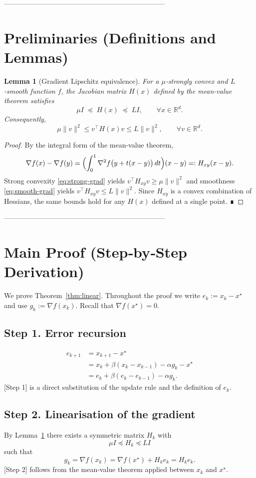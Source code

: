 \documentclass[11pt]{article}
\newtheorem{lemma}{Lemma}
\newcommand{\grad}{\nabla}
\newcommand{\R}{\mathbb{R}}
\begin{document}
---------------------------------------------------------------------

\newpage
\section*{Preliminaries (Definitions and Lemmas)}
\begin{lemma}[Gradient Lipschitz equivalence]\label{lem:grad-bounds}
For a $\mu$‑strongly convex and $L$‑smooth function $f$, the Jacobian matrix $H(x)$ defined by the mean‑value theorem satisfies
\[
\mu I \;\preceq\; H(x) \;\preceq\; L I ,\qquad\forall x\in\R^d .
\]
Consequently,
\[
\mu\|v\|^2 \le v^\top H(x) v \le L\|v\|^2 ,\qquad\forall v\in\R^d .
\]
\end{lemma}
\begin{proof}
By the integral form of the mean‑value theorem,
\[
\grad f(x)-\grad f(y)=\Bigl(\int_{0}^{1} \nabla^2 f\bigl(y+t(x-y)\bigr)\,dt\Bigr)(x-y)
=:H_{xy}(x-y).
\]
Strong convexity \eqref{eq:strong-grad} yields $v^\top H_{xy}v\ge\mu\|v\|^2$ and smoothness \eqref{eq:smooth-grad} yields $v^\top H_{xy}v\le L\|v\|^2$.  Since $H_{xy}$ is a convex combination of Hessians, the same bounds hold for any $H(x)$ defined at a single point.  ∎
\end{proof}

---------------------------------------------------------------------

\section*{Main Proof (Step‑by‑Step Derivation)}
We prove Theorem~\ref{thm:linear}.  Throughout the proof we write $e_k:=x_k-x^\star$ and use $g_k:=\grad f(x_k)$.  Recall that $\grad f(x^\star)=0$.

\subsection*{Step 1.  Error recursion}
\begin{align}
e_{k+1}
&=x_{k+1}-x^\star \nonumber\\
&=x_k+\beta(x_k-x_{k-1})-\alpha g_k - x^\star \nonumber\\
&=e_k+\beta(e_k-e_{k-1})-\alpha g_k . \label{eq:err-rec}
\end{align}
[Step 1] is a direct substitution of the update rule and the definition of $e_k$.

\subsection*{Step 2.  Linearisation of the gradient}
By Lemma~\ref{lem:grad-bounds} there exists a symmetric matrix $H_k$ with
\[
\mu I\preceq H_k\preceq L I
\]
such that
\[
g_k=\grad f(x_k)=\grad f(x^\star)+H_k e_k = H_k e_k .
\tag{2}
\]
[Step 2] follows from the mean‑value theorem applied between $x_k$ and $x^\star$.
\end{document}
